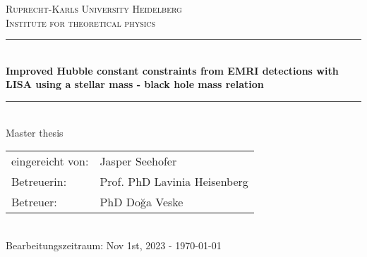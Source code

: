 
\begin{titlepage}
  \begin{center}

    \textsc{\LARGE
      Ruprecht-Karls University Heidelberg}\\[1cm]

    \textsc{Institute for theoretical physics}\\[3cm]

    \rule{\linewidth}{0.5mm}\\[1cm]

    { \huge \bfseries Improved Hubble constant constraints from EMRI detections with LISA using a stellar mass - black hole mass relation} \\[1cm]

    \rule{\linewidth}{0.5mm}\\[0.5cm]

    Master thesis \\[3cm]

    \begin{tabular}{l l}
      eingereicht von: & Jasper Seehofer              \\
      Betreuerin:      & Prof. PhD Lavinia Heisenberg \\
      Betreuer:        & PhD Do\u{g}a Veske           \\
    \end{tabular}\\[1cm]

    Bearbeitungszeitraum: Nov 1st, 2023 - \today
  \end{center}
\end{titlepage}
